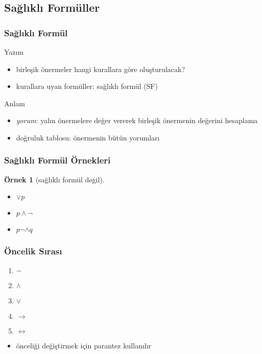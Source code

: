 \documentclass[dvipsnames]{beamer}
\theoremstyle{definition}
\theoremstyle{example}
\newtheorem{ornek}[theorem]{Örnek}
\theoremstyle{plain}
\begin{document}
\subsection{Sağlıklı Formüller}

\begin{frame}
  \frametitle{Sağlıklı Formül}

  \begin{block}{Yazım}
    \begin{itemize}
      \item birleşik önermeler hangi kurallara göre oluşturulacak?
      \item kurallara uyan formüller: \alert{sağlıklı formül} (SF)
    \end{itemize}
  \end{block}

  \pause
  \begin{block}{Anlam}
    \begin{itemize}
      \item \emph{yorum}: yalın önermelere değer vererek birleşik önermenin
        değerini hesaplama
      \item doğruluk tablosu: önermenin bütün yorumları
    \end{itemize}
  \end{block}
\end{frame}

\begin{frame}
  \frametitle{Sağlıklı Formül Örnekleri}

  \begin{ornek}[sağlıklı formül değil]
    \begin{itemize}
      \item $\vee p$
      \item $p \wedge \neg$
      \item $p \neg \wedge q$
    \end{itemize}
  \end{ornek}
\end{frame}

\begin{frame}
  \frametitle{Öncelik Sırası}

  \begin{enumerate}
    \item $\neg$
    \item $\wedge$
    \item $\vee$
    \item $\rightarrow$
    \item $\leftrightarrow$
  \end{enumerate}

  \begin{itemize}
    \item önceliği değiştirmek için parantez kullanılır
  \end{itemize}
\end{frame}
\end{document}
